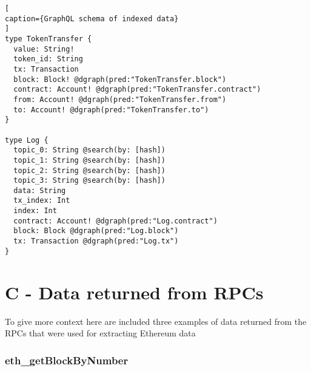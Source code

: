 \begin{lstlisting}[
caption={GraphQL schema of indexed data}
]
type TokenTransfer {
  value: String!
  token_id: String
  tx: Transaction
  block: Block! @dgraph(pred:"TokenTransfer.block")
  contract: Account! @dgraph(pred:"TokenTransfer.contract")
  from: Account! @dgraph(pred:"TokenTransfer.from")
  to: Account! @dgraph(pred:"TokenTransfer.to")
}

type Log {
  topic_0: String @search(by: [hash])
  topic_1: String @search(by: [hash])
  topic_2: String @search(by: [hash])
  topic_3: String @search(by: [hash])
  data: String 
  tx_index: Int
  index: Int
  contract: Account! @dgraph(pred:"Log.contract")
  block: Block @dgraph(pred:"Log.block")
  tx: Transaction @dgraph(pred:"Log.tx")
}
\end{lstlisting}

\chapter*{C - Data returned from RPCs}

To give more context here are included three examples of data returned from the RPCs that were used for extracting Ethereum data 


\subsection*{eth\_getBlockByNumber}

